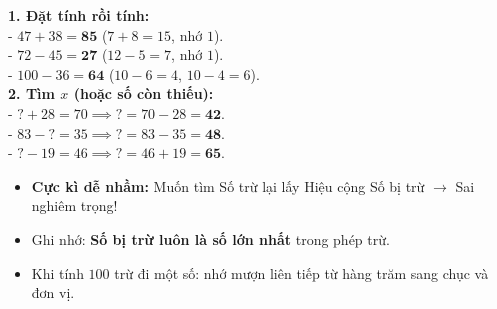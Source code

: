\documentclass[10pt,a4paper]{article}
\begin{document}
\vspace{-1.5mm}
\noindent
\begin{minipage}[t]{0.49\textwidth}\vspace{0pt}
\begin{tcolorbox}[
  enhanced,
  colback=green!4!white,
  colframe=green!60!black,
  arc=2mm, boxrule=0.8pt,
  left=2mm, right=2mm, top=1.8mm, bottom=1.8mm,
  title={\footnotesize\bfseries\color{white}\faCheckCircle\ 4. Bài tập thực hành mẫu}
]
{\footnotesize
\textbf{1. Đặt tính rồi tính:}\\
- $47 + 38 = \mathbf{85}$ ($7+8=15$, nhớ $1$).\\
- $72 - 45 = \mathbf{27}$ ($12-5=7$, nhớ $1$).\\
- $100 - 36 = \mathbf{64}$ ($10-6=4$, $10-4=6$).\\
\textbf{2. Tìm $x$ (hoặc số còn thiếu):}\\
- $? + 28 = 70 \implies ? = 70 - 28 = \mathbf{42}$.\\
- $83 - ? = 35 \implies ? = 83 - 35 = \mathbf{48}$.\\
- $? - 19 = 46 \implies ? = 46 + 19 = \mathbf{65}$.
}
\end{tcolorbox}
\end{minipage}
\hfill
\begin{minipage}[t]{0.49\textwidth}\vspace{0pt}
\begin{tcolorbox}[
  enhanced,
  colback=rose!4!white,
  colframe=rose!70!black,
  arc=2mm, boxrule=0.8pt,
  left=2mm, right=2mm, top=1.8mm, bottom=1.8mm,
  title={\footnotesize\bfseries\color{white}\faExclamationTriangle\ 5. Lỗi hay nhầm công thức}
]
{\footnotesize
\begin{itemize}\setlength{\itemsep}{1.5pt}\setlength{\leftskip}{-2.5mm}
  \item \textbf{Cực kì dễ nhầm:} Muốn tìm Số trừ lại lấy Hiệu cộng Số bị trừ $\to$ Sai nghiêm trọng!
  \item Ghi nhớ: \textbf{Số bị trừ luôn là số lớn nhất} trong phép trừ.
  \item Khi tính $100$ trừ đi một số: nhớ mượn liên tiếp từ hàng trăm sang chục và đơn vị.
\end{itemize}
}
\end{tcolorbox}
\end{minipage}
\end{document}
